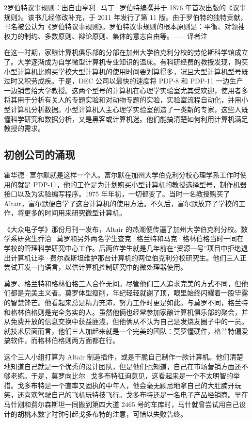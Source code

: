 \documentclass[12pt,UTF8]{ctexbook}
\begin{document}
2罗伯特议事规则：出自由亨利·马丁·罗伯特编撰并于 1876 年首次出版的《议事规则》。该书几经修改补充，于 2011 年发行了第 11 版。由于罗伯特的独特贡献，书名被公认为《罗伯特议事规则》。罗伯特议事规则的根本原则是：平衡、对领袖权力的制约、多数原则、辩论原则、集体的意志自由等。——译者注

在这一时期，家酿计算机俱乐部的分部在加州大学伯克利分校的劳伦斯科学馆成立了。大学逐渐成为自学微型计算机专业知识的温床。有科研经费的教授发现，购买小型计算机比购买学校大型计算机的使用时间要划算得多，况且大型计算机型号既过时又积劳成疾。于是，DEC 公司以最快的速度将 PDP-8 和 PDP-11 一边生产一边销售给大学教授。这两个型号的计算机在心理学实验室尤其受欢迎，使用者多将其用于分析有关人的专题实验和对动物专题的实验，实验室流程自动化，并用小型计算机分析数据。小型计算机入主心理学实验室创造了一类新的专家，这些人既懂科学研究和数据分析，又是黑客或计算机迷。他们能搞清楚如何利用计算机满足教授的需求。





\subsection{初创公司的涌现}


霍华德·富尔默就是这样一个人。富尔默在加州大学伯克利分校心理学系工作时使用的就是 PDP-11，他的工作是为计划购买小型计算机的教授选择型号，制作机器接口以及为实验编写程序。1975 年年初，一切都变了。当时一名教授购买了 Altair，富尔默便自学了这台计算机的使用方法。不久后，富尔默放弃了学校的工作，将更多的时间用来研究微型计算机。

《大众电子学》那份月刊一发布，Altair 的热潮便传遍了加州大学伯克利分校。数学系研究生乔治·莫罗和另外两名学生查克·格兰特和马克·格林伯格当时一同在学校的管理科学研究中心工作。后两位学生就是几年前在“资源一号”项目中拒绝退出计算机让李·费尔森斯坦维护那台计算机的两位伯克利分校研究生。他们三人正尝试开发一门语言，以供计算机控制研究中的微处理器使用。

莫罗、格兰特和格林伯格三人合作无间。尽管他们三人追求完美的方式不同，但他们都是完美主义者。莫罗体型瘦削，年纪轻轻就谢了顶，眼里始终闪耀着一股毕露的智慧锋芒。他看起来总是精力充沛，努力工作时更是如此。与莫罗不同，格兰特和格林伯格则是完全务实的人。虽然他俩也经常参加家酿计算机俱乐部的聚会，并从免费开放的信息交换中获益匪浅，但他俩从不认为自己是发烧友圈子中的一员。就技术层面而言，他们三人加起来就是一个完美的团队：莫罗懂硬件，格兰特偏爱搞软件，而格林伯格则两方面都在行。

这个三人小组打算为 Altair 制造插件，或是干脆自己制作一款计算机。他们清楚地知道自己就是一个优秀的设计团队，但是他们也知道，自己在市场营销方面还不够老练。于是，莫罗向比尔·戈多布特征询意见，这看起来是一个不太明智的举措。戈多布特是一个直率又固执的中年人，他会毫无顾忌地拿自己的大肚腩开玩笑，还喜欢驾驶自己的飞机玩特技飞行。戈多布特还是一名电子产品经销商。早在马什刚和费尔森斯坦一同搬到第四大道 2465 号的车库时，马什就曾尝试用自己设计的胡桃木数字时钟引起戈多布特的注意，可惜以失败告终。
\end{document}
